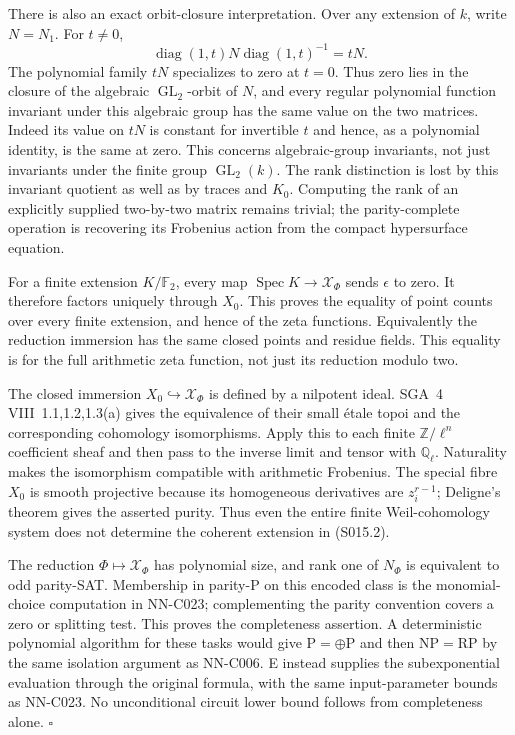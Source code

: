 There is also an exact orbit-closure interpretation. Over any extension
of $k$, write $N=N_1$. For $t\ne0$,
\[
 \operatorname{diag}(1,t)N\operatorname{diag}(1,t)^{-1}=tN.
\]
The polynomial family $tN$ specializes to zero at $t=0$. Thus zero
lies in the closure of the algebraic $\operatorname{GL}_2$-orbit of
$N$, and every regular polynomial function invariant under this
algebraic group has the same value on the two matrices. Indeed its
value on $tN$ is constant for invertible $t$ and hence, as a polynomial
identity, is the same at zero. This concerns algebraic-group invariants,
not just invariants under the finite group $\operatorname{GL}_2(k)$.
The rank distinction is lost by this invariant quotient as well as by
traces and $K_0$. Computing the rank of an explicitly supplied
two-by-two matrix remains trivial; the parity-complete operation is
recovering its Frobenius action from the compact hypersurface equation.

For a finite extension $K/\mathbb F_2$, every map
$\operatorname{Spec}K\to\mathcal X_\Phi$ sends $\epsilon$ to zero.
It therefore factors uniquely through $X_0$. This proves the
equality of point counts over every finite extension, and hence
of the zeta functions. Equivalently the reduction immersion has
the same closed points and residue fields. This equality is for
the full arithmetic zeta function, not just its reduction modulo two.

The closed immersion $X_0\hookrightarrow\mathcal X_\Phi$ is defined
by a nilpotent ideal. SGA~4 VIII~1.1,1.2,1.3(a) gives the
equivalence of their small \'etale topoi and the corresponding
cohomology isomorphisms. Apply this to each finite
$\mathbb Z/\ell^n$ coefficient sheaf and then pass to the inverse
limit and tensor with $\mathbb Q_\ell$. Naturality makes the
isomorphism compatible with arithmetic Frobenius. The special
fibre $X_0$ is smooth projective because its homogeneous derivatives
are $z_i^{r-1}$; Deligne's theorem gives the asserted purity.
Thus even the entire finite Weil-cohomology system does not
determine the coherent extension in (S015.2).

The reduction $\Phi\mapsto\mathcal X_\Phi$ has polynomial size,
and rank one of $N_\Phi$ is equivalent to odd parity-SAT. Membership
in parity-P on this encoded class is the monomial-choice computation
in NN-C023; complementing the parity convention covers a zero or
splitting test. This proves the completeness assertion.
A deterministic polynomial algorithm for these tasks would give
$\mathrm P=\oplus\mathrm P$ and then $\mathrm{NP}=\mathrm{RP}$
by the same isolation argument as NN-C006. E instead supplies the
subexponential evaluation through the original formula, with the
same input-parameter bounds as NN-C023. No unconditional circuit
lower bound follows from completeness alone.
\hfill$\square$

